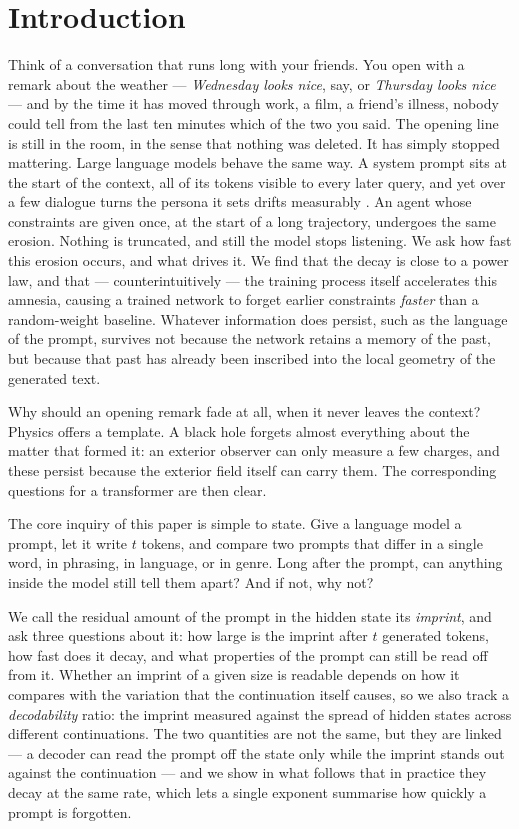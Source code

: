 \documentclass[11pt]{article}
\theoremstyle{definition}
\theoremstyle{remark}
\begin{document}
\section{Introduction}
\label{sec:intro}

Think of a conversation that runs long with your friends. You open with a remark about the weather --- \emph{Wednesday looks nice}, say, or \emph{Thursday looks nice} --- and by the time it has moved through work, a film, a friend's illness, nobody could tell from the last ten minutes which of the two you said. The opening line is still in the room, in the sense that nothing was deleted. It has simply stopped mattering. Large language models behave the same way. A system prompt sits at the start of the context, all of its tokens visible to every later query, and yet over a few dialogue turns the persona it sets drifts measurably \citep{li2024instability}. An agent whose constraints are given once, at the start of a long trajectory, undergoes the same erosion. Nothing is truncated, and still the model stops listening. We ask how fast this erosion occurs, and what drives it. We find that the decay is close to a power law, and that --- counterintuitively --- the training process itself accelerates this amnesia, causing a trained network to forget earlier constraints \emph{faster} than a random-weight baseline. Whatever information does persist, such as the language of the prompt, survives not because the network retains a memory of the past, but because that past has already been inscribed into the local geometry of the generated text.

Why should an opening remark fade at all, when it never leaves the context? Physics offers a template. A black hole forgets almost everything about the matter that formed it: an exterior observer can only measure a few charges, and these persist because the exterior field itself can carry them. The corresponding questions for a transformer are then clear.

The core inquiry of this paper is simple to state. Give a language model a prompt, let it write $t$ tokens, and compare two prompts that differ in a single word, in phrasing, in language, or in genre. Long after the prompt, can anything inside the model still tell them apart? And if not, why not?

We call the residual amount of the prompt in the hidden state its \emph{imprint}, and ask three questions about it: how large is the imprint after $t$ generated tokens, how fast does it decay, and what properties of the prompt can still be read off from it. Whether an imprint of a given size is readable depends on how it compares with the variation that the continuation itself causes, so we also track a \emph{decodability} ratio: the imprint measured against the spread of hidden states across different continuations. The two quantities are not the same, but they are linked --- a decoder can read the prompt off the state only while the imprint stands out against the continuation --- and we show in what follows that in practice they decay at the same rate, which lets a single exponent summarise how quickly a prompt is forgotten.
\end{document}
